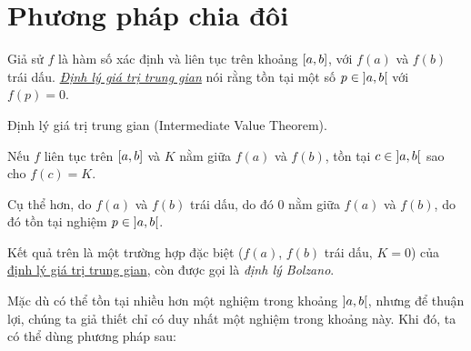 \documentclass[../../Lectures]{subfiles}
\begin{document}
\section{Phương pháp chia đôi}

Giả sử \(f\) là hàm số xác định và liên tục trên khoảng \(\interval{a}{b}\), với
\(f(a)\) và \(f(b)\) trái dấu.
\emph{\hyperref[thm:intermediate_value_theorem]{Định lý giá trị trung gian}} nói
rằng tồn tại một số \(p \in \interval[open]{a}{b}\) với \(f(p) = 0\).

\begin{theorem}\label{thm:intermediate_value_theorem}
    Định lý giá trị trung gian (Intermediate Value Theorem).

    Nếu \(f\) liên tục trên \(\interval{a}{b}\) và \(K\) nằm giữa \(f(a)\) và
    \(f(b)\), tồn tại \(c \in \interval[open]{a}{b}\) sao cho \(f(c) = K\).
\end{theorem}

Cụ thể hơn, do \(f(a)\) và \(f(b)\) trái dấu, do đó \(0\) nằm giữa \(f(a)\) và
\(f(b)\), do đó tồn tại nghiệm \(p \in \interval[open]{a}{b}\).

Kết quả trên là một trường hợp đặc biệt (\(f(a)\), \(f(b)\) trái dấu, \(K = 0\))
của \hyperref[thm:intermediate_value_theorem]{định lý giá trị trung gian}, còn
được gọi là \emph{định lý Bolzano}.

Mặc dù có thể tồn tại nhiều hơn một nghiệm trong khoảng
\(\interval[open]{a}{b}\), nhưng để thuận lợi, chúng ta giả thiết chỉ có duy
nhất một nghiệm trong khoảng này. Khi đó, ta có thể dùng phương pháp sau:
\end{document}

